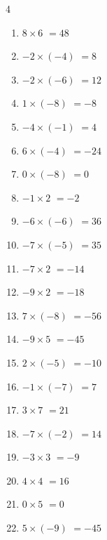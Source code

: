 \begin{multicols}{4}
\begin{enumerate}
\resetques

  \item $8\times 6$
        $=48$

  \item $-2\times (-4)$
        $=8$

  \item $-2\times (-6)$
        $=12$

  \item $1\times (-8)$
        $=-8$

  \item $-4\times (-1)$
        $=4$

  \item $6\times (-4)$
        $=-24$

  \item $0\times (-8)$
        $=0$

  \item $-1\times 2$
        $=-2$

  \item $-6\times (-6)$
        $=36$

  \item $-7\times (-5)$
        $=35$

  \item $-7\times 2$
        $=-14$

  \item $-9\times 2$
        $=-18$

  \item $7\times (-8)$
        $=-56$

  \item $-9\times 5$
        $=-45$

  \item $2\times (-5)$
        $=-10$

  \item $-1\times (-7)$
        $=7$

  \item $3\times 7$
        $=21$

  \item $-7\times (-2)$
        $=14$

  \item $-3\times 3$
        $=-9$

  \item $4\times 4$
        $=16$

  \item $0\times 5$
        $=0$

  \item $5\times (-9)$
        $=-45$


\end{enumerate}
\end{multicols}
